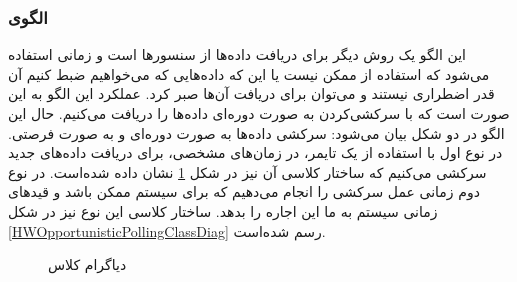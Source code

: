 \subsubsection{الگوی }
\label{HWPollingSec}
\begin{RTL}
این الگو \cite{ref1} یک روش دیگر برای دریافت داده‌ها
از سنسورها است و زمانی استفاده می‌شود که
استفاده از  ممکن نیست یا این که
داده‌هایی که می‌خواهیم ضبط کنیم آن قدر اضطراری نیستند و می‌توان برای دریافت آن‌ها
صبر کرد. عملکرد این الگو به این صورت است که با سرکشی‌کردن به صورت دوره‌ای داده‌ها
را دریافت می‌کنیم. حال این الگو در دو شکل بیان می‌شود: سرکشی داده‌ها به صورت
دوره‌ای و به صورت فرصتی.
در نوع اول با استفاده از یک تایمر، در زمان‌های مشخصی، برای دریافت داده‌های جدید
سرکشی می‌کنیم که ساختار کلاسی آن نیز
در شکل \ref{HWPeriodicPollingClassDiag} نشان داده شده‌است.
در نوع دوم زمانی عمل سرکشی را انجام می‌دهیم که برای سیستم ممکن باشد و
قیدهای زمانی سیستم به ما این اجاره را بدهد. ساختار کلاسی این نوع نیز در شکل
\ref{HWOpportunisticPollingClassDiag} رسم شده‌است.
\end{RTL}
\begin{figure}[h!]
\centering
{}
\caption{دیاگرام کلاس }
\label{HWPeriodicPollingClassDiag}
\end{figure}


